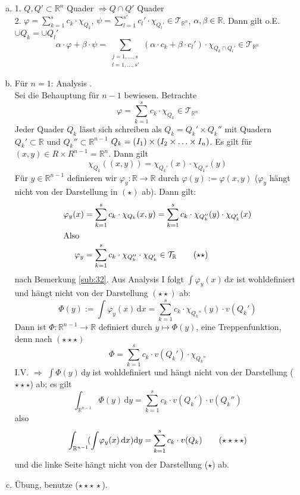 \begin{enumerate}[a)]
	\item 1. $Q, Q' \subset \mathds{R}^n$ Quader $\Rightarrow Q \cap Q'$ Quader \\
	2. $\varphi = \sum_{k=1}^{s} c_k \cdot \chi_{Q_k}$, $\psi = \sum_{l=1}^{s'}c_l' \cdot \chi_{Q_l'} \in \mathcal{T}_{\mathds{R}^n} $, $\alpha, \beta \in \mathds{R}$. Dann
	gilt o.E. $\cup Q_k  = \cup Q_l'$
	\[
		\alpha \cdot \varphi + \beta \cdot \psi = \sum_{\substack{j=1, \ldots ,s \\ l=1, \ldots ,s'}} (\alpha \cdot c_k + \beta \cdot c_l') \cdot \chi_{Q_k \cap Q_l'} \in
		\mathcal{T}_{\mathds{R}^n} 
	\]
	\item Für $n=1$: Analysis . \\
	Sei die Behauptung für $n-1$ bewiesen. Betrachte 
	\[
		\varphi = \sum_{k=1}^{s} c_k \cdot \chi_{Q_k} \in \mathcal{T}_{\mathds{R}^n} \tag{$\star$}
	\]
	Jeder Quader $Q_k$ lässt sich schreiben als $Q_k = Q_k ' \times Q_k'' $ mit Quadern $Q_k'  \subset \mathds{R}$ und $Q_k'' \subset \mathds{R}^{n-1}$ 
	$Q_k = (I_1) \times \enbrace{I_2 \times \ldots \times I_n} $. Es gilt für $(x,y) \in R \times R^{n-1}= \mathds{R}^n$. Dann gilt
	\[
		\chi_{Q_k} ((x,y)) = \chi_{Q_k'}(x) \cdot \chi_{Q_k''}(y)
	\]
	Für $y \in \mathds{R}^{n-1}$ definieren wir $\varphi_y : \mathds{R} \to \mathds{R}$ durch $\varphi(y) := \varphi(x,y)$ ($\varphi_y$ hängt nicht von der Darstellung
	in $(\star)$ ab). Dann gilt:
	\begin{align*}
		\varphi_y(x) &= \sum_{k=1}^{s} c_k \cdot \chi_{Q_k} (x,y) = \sum_{k=1}^{s} c_k \cdot \chi_{Q_k''}(y) \cdot \chi_{Q_k'}(x) \\
		\intertext{Also} \varphi_y &= \sum_{k=1}^{s} c_k \cdot \chi_{Q_k''} \cdot \chi_{Q_k'} \in \mathcal{T}_{\mathds{R}} \tag{$\star\star$}
	\end{align*}
	nach Bemerkung \ref{sub:32}. Aus Analysis I folgt $\int \varphi_y(x)  \, \mathrm{d}x $ ist wohldefiniert und hängt nicht von der Darstellung $(\star\star)$ ab:
	\[
		\Phi (y) := \int \! \varphi_y(x)  \, \mathrm{d}x  = \sum_{k=1}^{s} c_k \cdot  \chi_{Q_k''}(y) \cdot v(Q_k') \tag{$\star\star\star$}
	\]
	Dann ist $\Phi : \mathds{R}^{n-1} \to \mathds{R}$ definiert durch $y \mapsto \Phi(y)$, eine Treppenfunktion, denn nach $(\star\star\star)$
	\[
		\Phi = \sum_{k=1}^{s} c_k \cdot v(Q_k') \cdot \chi_{Q_k''}
	\]
	I.V. $\Rightarrow $ $\int \! \Phi(y)  \, \mathrm{d}y$ ist wohldefiniert und hängt nicht von der Darstellung ($\star\star\star$) ab; es gilt
	\[
		\int_{\mathds{R}^{n-1}} \! \Phi (y)  \, \mathrm{d}y = \sum_{k=1}^{s} c_k \cdot v(Q_k') \cdot v(Q_k'')
	\]
	also 
	\[
		\int_{\mathds{R}^{n-1}}\! \enbrace{\int \! \varphi_y(x)  \, \mathrm{d}x } \mathrm{d}y  = \sum_{k=1}^{s} c_k \cdot v(Q_k) \tag{$\star\star\star\,\star$}
	\]
	und die linke Seite hängt nicht von der Darstellung ($\star$) ab. 
	\item Übung, benutze ($\star\star\star\,\star$). \bewende
\end{enumerate}

